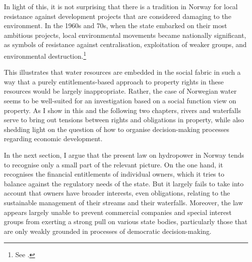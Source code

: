 In light of this, it is not surprising that there is a tradition in Norway for local resistance against development projects that are considered damaging to the environment. In the 1960s and 70s, when the state embarked on their most ambitious projects, local environmental movements became nationally significant, as symbols of resistance against centralisation, exploitation of weaker groups, and environmental destruction.\footnote{See \cite{nilsen08}.}

This illustrates that water resources are embedded in the social fabric in such a way that a purely entitlements-based approach to property rights in these resources would be largely inappropriate. Rather, the case of Norwegian water seems to be well-suited for an investigation based on a social function view on property. As I show in this and the following two chapters, rivers and waterfalls serve to bring out tensions between rights and obligations in property, while also shedding light on the question of how to organise decision-making processes regarding economic development.

In the next section, I argue that the present law on hydropower in Norway tends to recognise only a small part of the relevant picture. On the one hand, it recognises the financial entitlements of individual owners, which it tries to balance against the regulatory needs of the state. But it largely fails to take into account that owners have broader interests, even obligations, relating to the sustainable management of their streams and their waterfalls. Moreover, the law appears largely unable to prevent commercial companies and special interest groups from exerting a strong pull on various state bodies, particularly those that are only weakly grounded in processes of democratic decision-making.

